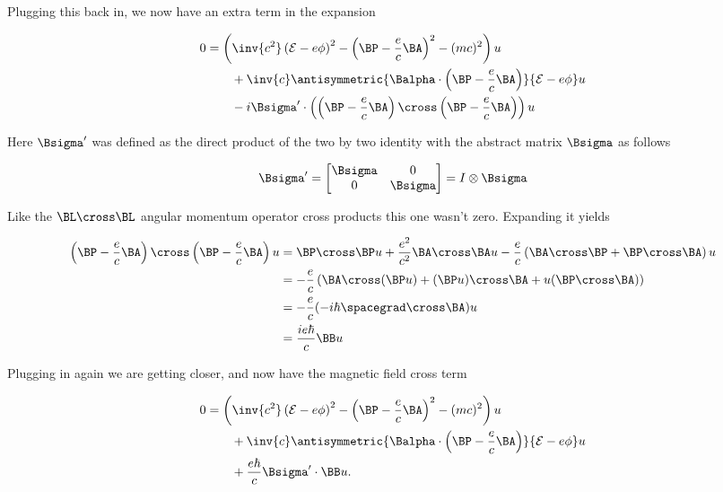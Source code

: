 Plugging this back in, we now have an extra term in the expansion

\begin{align*}
0
&=
\left(
\inv{c^2} \left( \mathcal{E} - e \phi \right)^2
- \left( \BP - \frac{e}{c} \BA \right)^2
- (mc)^2
\right) u
\\
&\qquad + \inv{c} \antisymmetric{
\Balpha \cdot \left(\BP - \frac{e}{c} \BA \right)
}
{
\mathcal{E} - e \phi
} u
\\
&\qquad
- i \Bsigma' \cdot
\left(
\left( \BP - \frac{e}{c} \BA \right) \cross \left( \BP - \frac{e}{c} \BA \right)
\right)
 u
\end{align*}

Here $\Bsigma'$ was defined as the direct product of the two by two identity with the abstract matrix $\Bsigma$ as follows

\begin{equation}\label{eqn:diracGauge:380}
\Bsigma' =
\begin{bmatrix}
\Bsigma & 0 \\
0 & \Bsigma
\end{bmatrix}
= I \otimes \Bsigma
\end{equation}

Like the $\BL \cross \BL$ angular momentum operator cross products this one wasn't zero.  Expanding it yields

\begin{align*}
\left( \BP - \frac{e}{c} \BA \right) \cross \left( \BP - \frac{e}{c} \BA \right)
 u
&=
\BP \cross \BP u
+ \frac{e^2}{c^2} \BA \cross \BA u
- \frac{e}{c} \left( \BA \cross \BP + \BP \cross \BA \right) u \\
&=
- \frac{e}{c} \left( \BA \cross (\BP u) + (\BP u) \cross \BA + u (\BP \cross \BA) \right) \\
&=
- \frac{e}{c} (-i \hbar \spacegrad \cross \BA) u \\
&=
\frac{i e \hbar}{c} \BB u
\end{align*}

Plugging in again we are getting closer, and now have the magnetic field cross term

\begin{align*}
0
&=
\left(
\inv{c^2} \left( \mathcal{E} - e \phi \right)^2
- \left(\BP - \frac{e}{c} \BA \right)^2
- (mc)^2
\right) u
\\
&\qquad + \inv{c}
\antisymmetric{
\Balpha \cdot \left(\BP - \frac{e}{c} \BA \right)
}
{
\mathcal{E} - e \phi
} u
\\
&\qquad
+ \frac{e \hbar}{c} \Bsigma' \cdot \BB u.
\end{align*}

